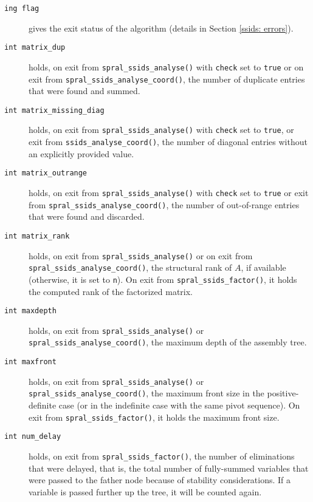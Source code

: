 \begin{description}

\item[\texttt{ing flag}] gives the exit status of the algorithm (details in Section \ref{ssids: errors}).

\item[\texttt{int matrix\_dup}] holds, on exit from
{\tt spral\_ssids\_analyse()} with {\tt check} set to {\tt true} or on exit from
{\tt spral\_ssids\_analyse\_coord()}, the
number of duplicate entries that were found and summed.

\item[\texttt{int matrix\_missing\_diag}] holds, on exit from
{\tt spral\_ssids\_analyse()} with {\tt check} set to {\tt true},
or exit from {\tt ssids\_analyse\_coord()}, the number of diagonal
entries without an explicitly provided value.

\item[\texttt{int matrix\_outrange}] holds, on exit from
{\tt spral\_ssids\_analyse()} with {\tt check} set to {\tt true} or exit from 
{\tt spral\_ssids\_analyse\_coord()}, the
number of out-of-range entries that were   found and discarded.

\item[\texttt{int matrix\_rank}] holds, on exit from
{\tt spral\_ssids\_analyse()} or on exit from {\tt spral\_ssids\_analyse\_coord()},
the structural rank of $A$, if available (otherwise, it is set to {\tt n}).
On exit from
{\tt spral\_ssids\_factor()}, it holds the computed rank of
the factorized matrix.

\item[\texttt{int maxdepth}] holds, on exit from
{\tt spral\_ssids\_analyse()} or {\tt spral\_ssids\_analyse\_coord()},
the maximum depth of the assembly tree.

\item[\texttt{int maxfront}] holds, on exit from
{\tt spral\_ssids\_analyse()} or {\tt spral\_ssids\_analyse\_coord()}, 
the maximum front size
in the positive-definite case (or in the indefinite case with
the same pivot sequence). On exit from
{\tt spral\_ssids\_factor()}, it holds the maximum front size.

\item[\texttt{int num\_delay}] holds, on exit from
{\tt spral\_ssids\_factor()}, the
number of eliminations that were
delayed, that is, the total number of fully-summed
variables that were passed to the father node because
of stability considerations. If a variable is passed
further up the tree, it will be counted again.


\end{description}
